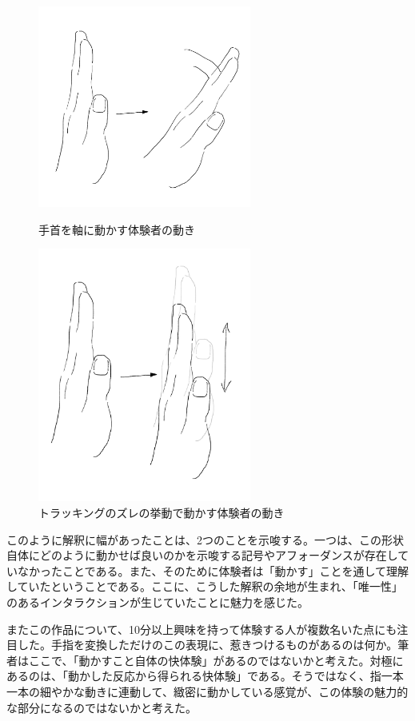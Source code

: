 \begin{figure}[htbp]
  \begin{minipage}[b]{0.5\linewidth}
    \centering
    \includegraphics[keepaspectratio, width=7cm]{img/movement0.jpg}
    \caption{手首を軸に動かす体験者の動き}
    \label{fig:movement_0}
  \end{minipage}
  \begin{minipage}[b]{0.5\linewidth}
    \centering
    \includegraphics[keepaspectratio, width=7cm]{img/movement1.jpg}
    \caption{トラッキングのズレの挙動で動かす体験者の動き}
    \label{fig:movement_1}
  \end{minipage}
\end{figure}

このように解釈に幅があったことは、2つのことを示唆する。一つは、この形状自体にどのように動かせば良いのかを示唆する記号やアフォーダンスが存在していなかったことである。また、そのために体験者は「動かす」ことを通して理解していたということである。ここに、こうした解釈の余地が生まれ、「唯一性」のあるインタラクションが生じていたことに魅力を感じた。

またこの作品について、10分以上興味を持って体験する人が複数名いた点にも注目した。手指を変換しただけのこの表現に、惹きつけるものがあるのは何か。筆者はここで、「動かすこと自体の快体験」があるのではないかと考えた。対極にあるのは、「動かした反応から得られる快体験」である。そうではなく、指一本一本の細やかな動きに連動して、緻密に動かしている感覚が、この体験の魅力的な部分になるのではないかと考えた。

